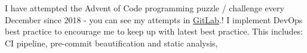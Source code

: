 \descript{ }
\vspace*{-\topsep}  %
\begin{justify}
I have attempted the Advent of Code programming puzzle / challenge every December since 2018 - you can see my attempts in \href{https://gitlab.com/laywill/}{GitLab}.!
I implement DevOps best practice to encourage me to keep up with latest best practice. This includes: CI pipeline, pre-commit beautification and static analysis, 
\end{justify}